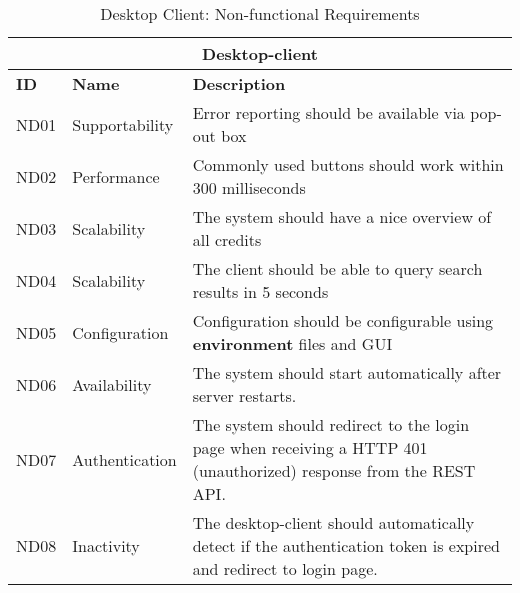 \begin{table}
    \centering
    \begin{tabular}{|p{1cm}|p{3.5cm}|p{11cm}|} 
        \hline
        \multicolumn{3}{|c|}{\textbf{Desktop-client}}  \\ 
        \hline
        \textbf{ID} & \textbf{Name} & \textbf{Description} \\
        \hline
        ND01 & Supportability &  Error reporting should be available via pop-out box \\
        \hline
        ND02 & Performance &  Commonly used buttons should work within 300 milliseconds \\
        \hline
        ND03 & Scalability &  The system should have a nice overview of all credits \\
        \hline
        ND04 & Scalability &  The client should be able to query search results in 5 seconds \\
        \hline
        ND05 & Configuration & Configuration should be configurable using \textbf{environment} files and GUI \\
        \hline
        ND06 & Availability &  The system should start automatically after server restarts. \\
        \hline
        ND07 & Authentication & The system should redirect to the login page when receiving a HTTP 401 (unauthorized) response from the REST API. \\
        \hline
        ND08 & Inactivity & The desktop-client should automatically detect if the authentication token is expired and redirect to login page. \\ 
        \hline
    \end{tabular}
    \caption{Desktop Client: Non-functional Requirements}
    \label{tab:desktop_client_nfunreq}
\end{table}

